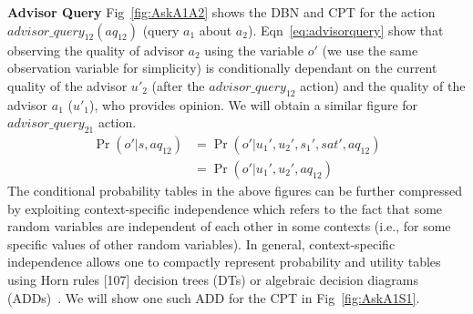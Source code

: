 \documentclass{aamas2013}
\begin{document}
\textbf{Advisor Query} Fig~\ref{fig:AskA1A2} shows the DBN and CPT for the action $advisor\_query_{12} (aq_{12})$ (query $a_1$ about $a_2$).  Eqn~\ref{eq:advisorquery} show that observing the quality of advisor $a_2$ using the variable $o'$ (we use the same observation variable for simplicity) is conditionally dependant on the current quality of the advisor $u'_2$ (after the $advisor\_query_{12}$ action) and the quality of the advisor $a_1$ ($u'_1$), who provides opinion. We will obtain a similar figure for $advisor\_query_{21}$ action.
\begin{equation}
\begin{split}
\Pr(o'|s,aq_{12})&=\Pr(o'|u_1',u_2',s_1',sat',aq_{12})\\
&=\Pr(o'|u_1',u_2',aq_{12})
\end{split}
 \label{eq:advisorquery}
\end{equation}
The conditional probability tables in the above figures can be further compressed by exploiting context-specific independence which refers to the fact that some random variables are independent of each other in some contexts (i.e., for some specific values of other random variables). In general, context-specific independence allows one to compactly represent probability and utility tables using Horn rules [107] decision trees (DTs) or algebraic decision diagrams (ADDs)~\cite{boutilier1996context}. We will show one such ADD for the CPT in Fig~\ref{fig:AskA1S1}. 
\end{document}
